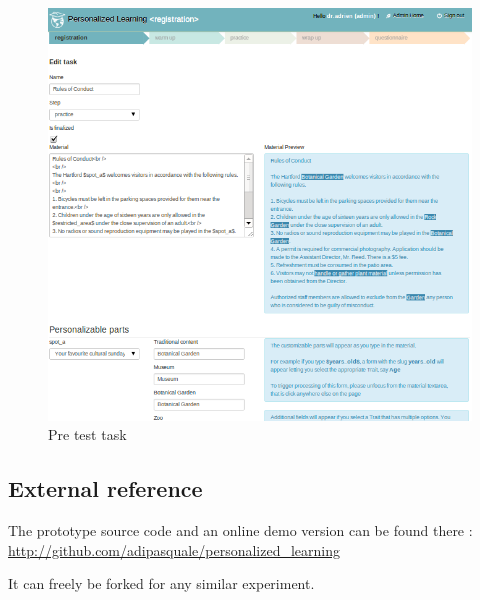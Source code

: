 \documentclass[a4paper,12pt]{article}
\makeatletter
\def\maxwidth{%
  \ifdim\Gin@nat@width>\linewidth
    \linewidth
  \else
    \Gin@nat@width
  \fi
}
\makeatother
\begin{document}
\begin{figure}
\begin{center}
\includegraphics[width=\maxwidth]{edit_task.png}
\caption{Pre test task}
\label{pre_test}
\end{center}
\end{figure}


\subsection{External reference}

The prototype source code and an online demo version can be found there :
\url{http://github.com/adipasquale/personalized_learning}

It can freely be forked for any similar experiment.


\nocite{*}

\end{document}

